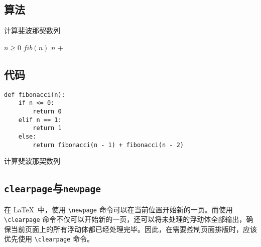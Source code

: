 \subsection{算法}

\begin{algorithm}
    \caption{计算斐波那契数列}
    \begin{algorithmic}[1]
        \Require $n \geq 0$
        \Ensure $fib(n)$
        \State \Return $n$
        \Else
        \State \Return {} + 
        \EndIf
        \EndFunction
    \end{algorithmic}
\end{algorithm}

\subsection{代码}

\begin{listing}[htbp]
    \begin{verbatim}
def fibonacci(n):
    if n <= 0:
        return 0
    elif n == 1:
        return 1
    else:
        return fibonacci(n - 1) + fibonacci(n - 2)
  \end{verbatim}
    \caption{计算斐波那契数列}
\end{listing}

\subsection{\texttt{clearpage}与\texttt{newpage}}

在 \LaTeX\ 中，使用 \verb|\newpage| 命令可以在当前位置开始新的一页。而使用 \verb|\clearpage| 命令不仅可以开始新的一页，还可以将未处理的浮动体全部输出，确保当前页面上的所有浮动体都已经处理完毕。因此，在需要控制页面排版时，应该优先使用 \verb|\clearpage| 命令。